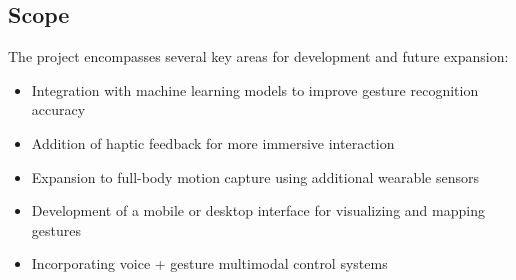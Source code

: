 \subsection{Scope}
The project encompasses several key areas for development and future expansion:
\begin{itemize}
    \item Integration with machine learning models to improve gesture recognition accuracy
    \item Addition of haptic feedback for more immersive interaction
    \item Expansion to full-body motion capture using additional wearable sensors
    \item Development of a mobile or desktop interface for visualizing and mapping gestures
    \item Incorporating voice + gesture multimodal control systems
\end{itemize}
